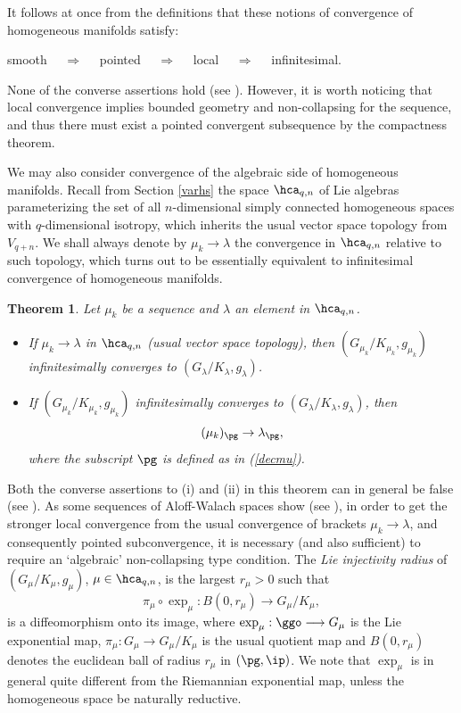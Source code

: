 \documentclass[11pt]{amsart}
\theoremstyle{plain}
\newtheorem{theorem}{Theorem}[section]
\theoremstyle{definition}
\theoremstyle{remark}
\begin{document}
It follows at once from the definitions that these notions of convergence of homogeneous manifolds satisfy:

\begin{center}
smooth $\quad\Rightarrow\quad$ pointed $\quad\Rightarrow\quad$ local $\quad\Rightarrow\quad$ infinitesimal.
\end{center}

None of the converse assertions hold (see \cite{spacehm}).  However, it is worth noticing that local convergence implies bounded geometry and non-collapsing for the sequence, and thus there must exist a pointed convergent subsequence by the compactness theorem.

We may also consider convergence of the algebraic side of homogeneous manifolds.  Recall from Section \ref{varhs} the space $\hca_{q,n}$ of Lie algebras parameterizing the set of all $n$-dimensional simply connected homogeneous spaces with $q$-dimensional isotropy, which inherits the usual vector space topology from $V_{q+n}$.  We shall always denote by $\mu_k\to\lambda$ the convergence in $\hca_{q,n}$ relative to such topology, which turns out to be essentially equivalent to infinitesimal convergence of homogeneous manifolds.


\begin{theorem}\label{convmu}\cite[Theorem 6.12]{spacehm}
Let $\mu_k$ be a sequence and $\lambda$ an element in $\hca_{q,n}$.
\begin{itemize}
\item[(i)] If $\mu_k\to\lambda$ in $\hca_{q,n}$ (usual vector space topology), then $(G_{\mu_k}/K_{\mu_k},g_{\mu_k})$ infinitesimally converges to $(G_{\lambda}/K_{\lambda},g_{\lambda})$.

\item[(ii)] If $(G_{\mu_k}/K_{\mu_k},g_{\mu_k})$ infinitesimally converges to $(G_{\lambda}/K_{\lambda},g_{\lambda})$, then
    $$
    (\mu_k)_{\pg}\to\lambda_{\pg},
    $$
    where the subscript $\pg$ is defined as in {\rm (\ref{decmu})}.
\end{itemize}
\end{theorem}

Both the converse assertions to (i) and (ii) in this theorem can in general be false (see \cite[Remark 6.13]{spacehm}).  As some sequences of Aloff-Walach spaces show (see \cite[Example 6.6]{spacehm}), in order to get the stronger local convergence from the usual convergence of brackets $\mu_k\to\lambda$, and consequently pointed subconvergence, it is necessary (and also sufficient) to require an `algebraic' non-collapsing type condition.
The {\it Lie injectivity radius} of $\left(G_\mu/K_\mu,g_\mu\right)$, $\mu\in\hca_{q,n}$, is the largest $r_\mu>0$ such that
$$
\pi_\mu\circ\exp_\mu: B(0,r_\mu)\longrightarrow G_\mu/K_\mu,
$$
is a diffeomorphism onto its image, where $\exp_\mu:\ggo\longrightarrow G_{\mu}$ is the Lie exponential map, $\pi_\mu:G_\mu\longrightarrow G_\mu/K_\mu$ is the usual quotient map and $B(0,r_\mu)$ denotes the euclidean ball of radius $r_\mu$ in $(\pg,\ip)$.  We note that $\exp_\mu$ is in general quite different from the Riemannian exponential map, unless the homogeneous space be naturally reductive.
\end{document}
